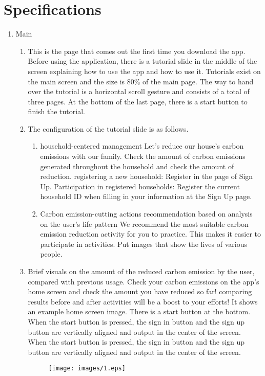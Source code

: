 \documentclass[11pt, conference]{IEEEtran}
\begin{document}
\section{\Large{Specifications}}
\begin{enumerate}[label=\arabic*]
    \item {\large{Main}}
    \begin{enumerate}[label=\alph*]
        \item This is the page that comes out the first time you download the app. Before using the application, there is a tutorial slide in the middle of the screen explaining how to use the app and how to use it. Tutorials exist on the main screen and the size is 80\% of the main page. The way to hand over the tutorial is a horizontal scroll gesture and consists of a total of three pages. At the bottom of the last page, there is a start button to finish the tutorial. 
        \item The configuration of the tutorial slide is as follows.
        \begin{enumerate}
            \item household-centered management Let's reduce our house's carbon emissions with our family. Check the amount of carbon emissions generated throughout the household and check the amount of reduction. registering a new household: Register in the page of Sign Up. Participation in registered households: Register the current household ID when filling in your information at the Sign Up page.
            \item Carbon emission-cutting actions recommendation based on analysis on the user's life pattern We recommend the most suitable carbon emission reduction activity for you to practice. This makes it easier to participate in activities. Put images that show the lives of various people.
        \end{enumerate}
        \item Brief visuals on the amount of the reduced carbon emission by the user, compared with previous usage. Check your carbon emissions on the app's home screen and check the amount you have reduced so far! comparing results before and after activities will be a boost to your efforts! It shows an example home screen image. There is a start button at the bottom. When the start button is pressed, the sign in button and the sign up button are vertically aligned and output in the center of the screen.\\
        When the start button is pressed, the sign in button and the sign up button are vertically aligned and output in the center of the screen.\\
        \begin{figure}[H]
            \centering
            \texttt{[image: images/1.eps]}
        \end{figure}
    \end{enumerate}
    

\end{enumerate}
\end{document}
